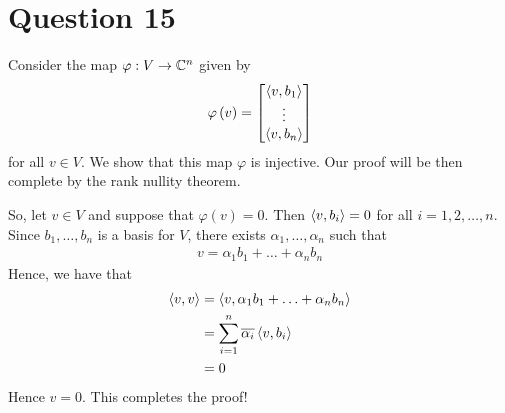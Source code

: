 \section{Question 15} Consider the map $\varphi : V \to \mathbb C ^{n}$ given by 
\begin{align*}
    \varphi \left( v \right)
    =
    \begin{bmatrix}
	\left\langle v, b_{1} \right\rangle \\
	\vdots \\
	\left\langle v, b_{n} \right\rangle
    \end{bmatrix}
\end{align*}
for all $v\in V$. We show that this map $\varphi$ is injective. Our proof will be then complete by the rank nullity theorem.

So, let $v\in V$ and suppose that $\varphi \left( v \right) = 0$. Then $\left\langle v, b_{i} \right\rangle = 0$ for all $i=1,2, \ldots,  n$. Since $b_{1} , \ldots , b_{n}$ is a basis for $V$, there exists $\alpha _{1} , \ldots , \alpha _{n}$ such that
\begin{align*}
    v= \alpha_{1} b_{1} + \ldots + \alpha _{n} b_{n}
\end{align*}
Hence, we have that 
\begin{align*}
    \left\langle v, v \right\rangle &= \left\langle v, \alpha_{1} b_{1} + \ldots + \alpha _{n} b_{n}  \right\rangle \\
    &= \sum_{i=1}^{n} \overline{\alpha_{i}} \left\langle v, b_{i} \right\rangle \\
    &= 0
\end{align*}
Hence $v=0$. This completes the proof!
